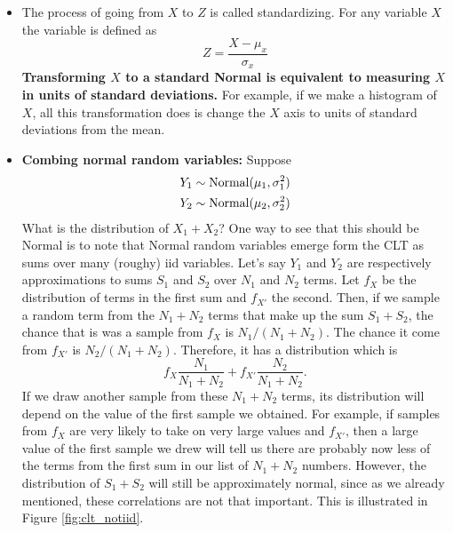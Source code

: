 \begin{itemize}
So 
\begin{equation*}\label{eq:normal_linear_trans}
Y \sim {\rm Normal}(a\mu_x + b,a^2\sigma_x^2).
\end{equation*}
Note that in going from $Z$ to $X$ and $X$ to $Y$, we are just multiplying and shifting everything.
Think about what this does to the histogram. 
\item The process of going from $X$ to $Z$ is called standardizing. For any variable $X$ the  variable is defined as 
\begin{equation*}
Z = \frac{X-\mu_x}{\sigma_x}
\end{equation*}
 {\bf Transforming $X$ to a standard Normal is equivalent to measuring $X$ in units of standard deviations.} For example, if we make a histogram of $X$, all this transformation does is change the $X$ axis to units of standard deviations from the mean. 
 


 \item {\bf Combing normal random variables:} Suppose
 \begin{align*}
Y_1 &\sim {\rm Normal}(\mu_1,\sigma_1^2)\\
Y_2 &\sim {\rm Normal}(\mu_2,\sigma_2^2)\\
\end{align*}
What is the distribution of $X_1+X_2$? One way to see that this should be Normal is to note that Normal random variables emerge form the CLT as sums over many (roughy) iid variables. Let's say $Y_1$ and $Y_2$ are respectively approximations to sums $S_1$ and $S_2$ over $N_1$ and $N_2$ terms. Let $f_X$ be the distribution of terms in the first sum and $f_{X'}$ the second. Then, if we sample a random term from the $N_1+N_2$ terms that make up the sum $S_1+S_2$, the chance that is was a sample from $f_{X}$ is $N_1/(N_1+N_2)$. The chance it come from $f_{X'}$ is $N_2/(N_1+N_2)$. Therefore, it has a distribution which is 
\begin{equation*}
f_X\frac{N_1}{N_1+N_2} + f_{X'}\frac{N_2}{N_1+N_2}.
\end{equation*}
If we draw another sample from these $N_1+N_2$ terms, its distribution will depend on the value of the first sample we obtained. For example, if samples from $f_X$ are very likely to take on very large values and $f_{X'}$, then a large value of the first sample we drew will tell us there are probably now less of the terms from the first sum in our list of $N_1+N_2$ numbers. However, the distribution of $S_1+S_2$ will still be approximately normal, since as we already mentioned, these correlations are not that important.  This is illustrated in Figure \ref{fig:clt_notiid}. 



\end{itemize}
